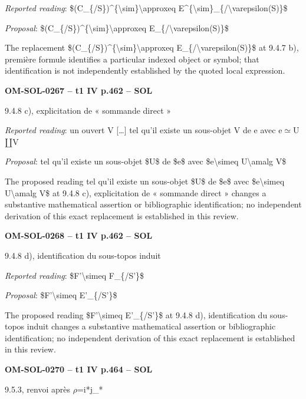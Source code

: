 \emph{Reported reading}: \$(C\_\{/S\})\textasciicircum{}\{\textbackslash{}sim\}\textbackslash{}approxeq E\textasciicircum{}\{\textbackslash{}sim\}\_\{/\textbackslash{}varepsilon(S)\}\$\par
\emph{Proposal}: \$(C\_\{/S\})\textasciicircum{}\{\textbackslash{}sim\}\textbackslash{}approxeq E\_\{/\textbackslash{}varepsilon(S)\}\$\par
The replacement \$(C\_\{/S\})\textasciicircum{}\{\textbackslash{}sim\}\textbackslash{}approxeq E\_\{/\textbackslash{}varepsilon(S)\}\$ at 9.4.7 b), première formule identifies a particular indexed object or symbol; that identification is not independently established by the quoted local expression.\par
\par\noindent\textbf{OM-SOL-0267 -- t1 IV p.462 -- SOL}\par
9.4.8 c), explicitation de « sommande direct »\par
\emph{Reported reading}: un ouvert V […] tel qu'il existe un sous-objet V de e avec e\ensuremath{\simeq}U\ensuremath{\amalg}V\par
\emph{Proposal}: tel qu'il existe un sous-objet \$U\$ de \$e\$ avec \$e\textbackslash{}simeq U\textbackslash{}amalg V\$\par
The proposed reading tel qu'il existe un sous-objet \$U\$ de \$e\$ avec \$e\textbackslash{}simeq U\textbackslash{}amalg V\$ at 9.4.8 c), explicitation de « sommande direct » changes a substantive mathematical assertion or bibliographic identification; no independent derivation of this exact replacement is established in this review.\par
\par\noindent\textbf{OM-SOL-0268 -- t1 IV p.462 -- SOL}\par
9.4.8 d), identification du sous-topos induit\par
\emph{Reported reading}: \$F'\textbackslash{}simeq F\_\{/S'\}\$\par
\emph{Proposal}: \$F'\textbackslash{}simeq E'\_\{/S'\}\$\par
The proposed reading \$F'\textbackslash{}simeq E'\_\{/S'\}\$ at 9.4.8 d), identification du sous-topos induit changes a substantive mathematical assertion or bibliographic identification; no independent derivation of this exact replacement is established in this review.\par
\par\noindent\textbf{OM-SOL-0270 -- t1 IV p.464 -- SOL}\par
9.5.3, renvoi après \ensuremath{\rho}=\allowbreak i*j\_*\par
